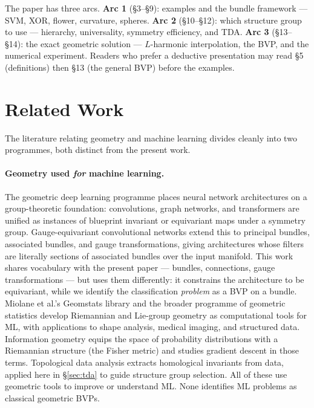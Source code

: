 \documentclass[11pt, a4paper]{article}
\theoremstyle{plain}
\theoremstyle{definition}
\begin{document}
The paper has three arcs. \textbf{Arc 1} (\S3--\S9): examples and the bundle
framework --- SVM, XOR, flower, curvature, spheres. \textbf{Arc 2}
(\S10--\S12): which structure group to use --- hierarchy, universality,
symmetry efficiency, and TDA. \textbf{Arc 3} (\S13--\S14): the exact geometric
solution --- $L$-harmonic interpolation, the BVP, and the numerical experiment.
Readers who prefer a deductive presentation may read \S5 (definitions) then
\S13 (the general BVP) before the examples.

\section{Related Work}\label{sec:related}

The literature relating geometry and machine learning divides cleanly into two
programmes, both distinct from the present work.

\paragraph{Geometry used \emph{for} machine learning.}
The geometric deep learning programme \cite{bronstein2021} places neural network
architectures on a group-theoretic foundation: convolutions, graph networks, and
transformers are unified as instances of blueprint invariant or equivariant maps
under a symmetry group. Gauge-equivariant convolutional networks
\cite{cohen2019gauge} extend this to principal bundles, associated bundles, and
gauge transformations, giving architectures whose filters are literally sections of
associated bundles over the input manifold. This work shares vocabulary with the
present paper --- bundles, connections, gauge transformations --- but uses them
differently: it constrains the architecture to be equivariant, while we identify
the classification \emph{problem} as a BVP on a bundle. Miolane et al.'s Geomstats
library \cite{miolane2020geomstats} and the broader programme of geometric
statistics \cite{miolane2025euclid} develop Riemannian and Lie-group geometry as
computational tools for ML, with applications to shape analysis, medical imaging,
and structured data. Information geometry \cite{amari2000} equips the space of
probability distributions with a Riemannian structure (the Fisher metric) and
studies gradient descent in those terms. Topological data analysis
\cite{edelsbrunner2010} extracts homological invariants from data, applied here in
\S\ref{sec:tda} to guide structure group selection. All of these use geometric
tools to improve or understand ML. None identifies ML problems as classical
geometric BVPs.
\end{document}
